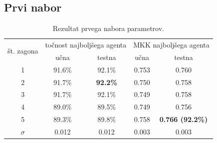 \subsection{Prvi nabor}\label{subsec:dodatek-statlog-prvi-nabor}
\begin{table}[H]
    \begin{center}
        \begin{tabular}{|| c | c c || c c ||}
            \hline
            \multirow{2}{*}{št. zagona} & \multicolumn{2}{c||}{točnost najboljšega agenta} & \multicolumn{2}{c||}{MKK najboljšega agenta} \\ \cline{2-5}
            & učna   & testna          & učna  & testna                  \\
            \hline
            1        & 91.6\% & 92.1\%          & 0.753 & 0.760                   \\
            \hline
            2        & 91.7\% & \textbf{92.2\%} & 0.750 & 0.758                   \\
            \hline
            3        & 91.7\% & 92.1\%          & 0.749 & 0.758                   \\
            \hline
            4        & 89.0\% & 89.5\%          & 0.749 & 0.756                   \\
            \hline
            5        & 89.3\% & 89.8\%          & 0.758 & \textbf{0.766 (92.2\%)} \\
            \hline
            $\sigma$ & 0.012  & 0.012           & 0.003 & 0.003                   \\
            \hline
        \end{tabular}
    \end{center}
    \caption{Rezultat prvega nabora parametrov.}
    \label{tab:statlog_result_1}
\end{table}

